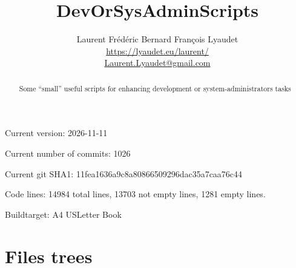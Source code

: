 \documentclass{article}
\begin{document}
\author{
  Laurent Frédéric Bernard François Lyaudet\\
  \url{https://lyaudet.eu/laurent/}\\
  \href{mailto:Laurent.Lyaudet@gmail.com}{Laurent.Lyaudet@gmail.com}
}
\title{DevOrSysAdminScripts}

\maketitle
\begin{abstract}
Some “small” useful scripts
for enhancing development or system-administrators tasks
\end{abstract}

Current version: 2026-11-11

Current number of commits: 1026

Current git SHA1: 11fea1636a9c8a80866509296dac35a7caa76c44

Code lines: 14984 total lines, 13703 not empty lines, 1281 empty lines.

Buildtarget: \buildtarget
\if{}
A4
\else\if{}%
USLetter
\else\if{}%
Book
\fi
\fi
\fi

\tableofcontents
\newpage

\section{Files trees}
\label{section:trees}
\end{document}
